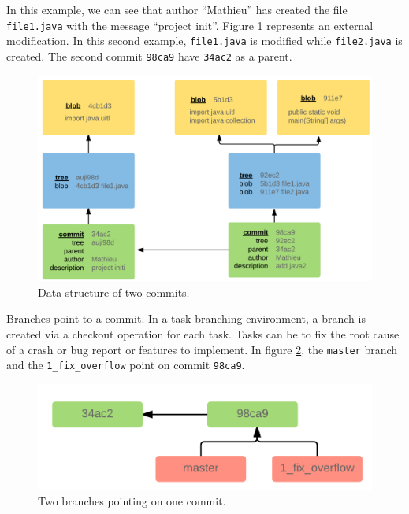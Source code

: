 \documentclass[12pt]{report}
\begin{document}
In this example, we can see that author ``Mathieu'' has created the file
\lstinline!file1.java! with the message ``project init''. Figure
\ref{fig:two-commits} represents an external modification. In this
second example, \lstinline!file1.java! is modified while
\lstinline!file2.java! is created. The second commit \lstinline!98ca9!
have \lstinline!34ac2! as a parent.

\begin{figure}[h!]
  \centering
    \includegraphics[scale=0.25]{media/branching.png}
    \caption{Data structure of two commits.
    \label{fig:two-commits}}
\end{figure}

Branches point to a commit. In a task-branching environment, a branch is
created via a checkout operation for each task. Tasks can be to fix the
root cause of a crash or bug report or features to implement. In figure
\ref{fig:two-branches}, the \lstinline!master! branch and the
\lstinline!1_fix_overflow! point on commit \lstinline!98ca9!.

\begin{figure}[h!]
  \centering
    \includegraphics[scale=0.25]{media/2branches.png}
    \caption{Two branches pointing on one commit.
    \label{fig:two-branches}}
\end{figure}
\end{document}
